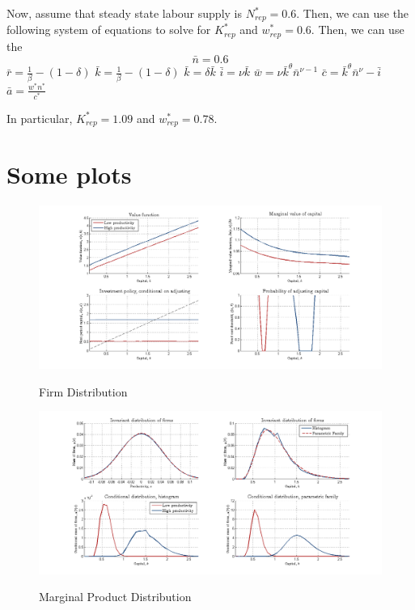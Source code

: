 \documentclass[]{article}
\begin{document}
Now, assume that steady state labour supply is \( N_{r e p}^{*}=0.6 . \) Then, we can use the following system of equations to solve for \( K_{r e p}^{*} \) and \( w_{r e p}^{*}=0.6 . \) Then, we can use the \[ \bar{n}=0.6 \]
\( \bar{r}=\frac{1}{\beta}-(1-\delta) \)
\( \bar{k}=\frac{1}{\beta}-(1-\delta) \)
\( \bar{k}=\delta \bar{k} \)
\( \bar{i}=\nu \bar{k} \)
\( \bar{w}=\nu \bar{k}^{\theta} \bar{n}^{\nu-1} \)
\( \bar{c}=\bar{k}^{\theta} \bar{n}^{\nu}-\bar{i} \)
\( \bar{a}=\frac{w^{*} n^{*}}{c^{*}} \)

In particular, \( K_{r e p}^{*}=1.09 \) and \( w_{r e p}^{*}=0.78 . \)


\section{Some plots}
\begin{figure}[H]
          \caption{Firm Distribution}
	\centering
	\includegraphics[scale=0.5]{Figures/Vf-1}
	\label{figure:1}
\end{figure}

\begin{figure}[H]
	\caption{Marginal Product Distribution}
            \centering
	\includegraphics[scale=0.5]{Figures/Vf-2}
	\label{figure:1}
\end{figure}
\end{document}
